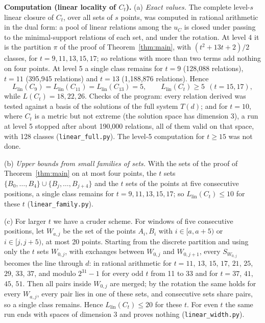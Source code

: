 \documentclass[11pt,a4paper]{article}
\theoremstyle{definition}
\theoremstyle{remark}
\newcommand{\file}[1]{\texttt{#1}}
\newcommand{\comp}[1]{\medskip\noindent\textbf{#1}}
\begin{document}
\comp{Computation (linear locality of $C_t$).} (a) \emph{Exact values.} The complete level-$s$ linear closure of
$C_t$, over all sets of $s$ points, was computed in rational arithmetic in the dual form: a pool of linear relations
among the $u_C$ is closed under passing to the minimal-support relations of each set, and under the rotation. At
level 4 it is the partition $\pi$ of the proof of Theorem~\ref{thm:main}, with $(t^2 + 13t + 2)/2$ classes, for
$t = 9, 11, 13, 15, 17$; so relations with more than two terms add nothing on four points. At level 5 a single
class remains for $t = 9$ (128,088 relations), $t = 11$ (395,945 relations) and $t = 13$ (1,188,876 relations).
Hence
\[
  L_{\mathrm{lin}}(C_9) = L_{\mathrm{lin}}(C_{11}) = L_{\mathrm{lin}}(C_{13}) = 5, \qquad L_{\mathrm{lin}}(C_t) \ge 5 \ \ (t = 15, 17),
\]
while $L(C_t) = 18, 22, 26$. Checks of the program: every relation derived was tested against a basis
of the solutions of the full system $T(d)$; and for $t = 10$, where $C_t$ is a metric but not extreme (the solution
space has dimension 3), a run at level 5 stopped after about 190,000 relations, all of them valid on that space, with
128 classes (\file{linear\_full.py}). The level-5 computation for $t \ge 15$ was not done.

(b) \emph{Upper bounds from small families of sets.} With the sets of the proof of Theorem~\ref{thm:main} on at most
four points, the $t$ sets $\{B_0, \dots, B_4\} \cup \{B_j, \dots, B_{j+4}\}$ and the $t$ sets of the points at five
consecutive positions, a single class remains for $t = 9, 11, 13, 15, 17$; so $L_{\mathrm{lin}}(C_t) \le 10$ for
these $t$ (\file{linear\_family.py}).

(c) For larger $t$ we have a cruder scheme. For windows of five consecutive positions, let $W_{a,j}$ be the
set of the points $A_i, B_i$ with $i \in [a, a + 5)$ or $i \in [j, j + 5)$, at most 20 points. Starting from the
discrete partition and using only the $t$ sets $W_{0,j}$, with exchanges between $W_{0,j}$ and $W_{0,j+1}$, every
$S_{W_{0,j}}$ becomes the line through $d$: in rational arithmetic for $t = 11$, $13$, $15$, $17$, $21$, $25$, $29$, $33$, $37$, and modulo
$2^{31} - 1$ for every odd $t$ from 11 to 33 and for $t = 37$, $41$, $45$, $51$. Then all pairs inside $W_{0,j}$ are merged; by the rotation the same
holds for every $W_{a,j}$, every pair lies in one of these sets, and consecutive sets share pairs, so a single
class remains. Hence $L_{\mathrm{lin}}(C_t) \le 20$ for these $t$. For even $t$ the same run ends with spaces of
dimension 3 and proves nothing (\file{linear\_width.py}).
\end{document}
